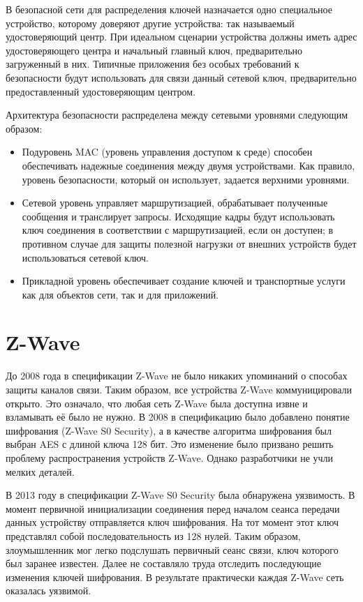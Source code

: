 	В безопасной сети для распределения ключей назначается одно специальное устройство, которому доверяют 
	другие устройства: так называемый удостоверяющий центр. При идеальном сценарии устройства должны 
	иметь адрес удостоверяющего центра и начальный главный ключ, предварительно загруженный в них. 
	Типичные приложения без особых требований к безопасности будут использовать для связи данный сетевой ключ, 
	предварительно предоставленный удостоверяющим центром.
	
	Архитектура безопасности распределена между сетевыми уровнями следующим образом:
	
	\begin{itemize}
		\item Подуровень MAC (уровень управления доступом к среде) способен обеспечивать надежные соединения
		между двумя устройствами. Как правило, уровень безопасности, который он использует, задается 
		верхними уровнями.
		\item Сетевой уровень управляет маршрутизацией, обрабатывает полученные сообщения и транслирует
		запросы. Исходящие кадры будут использовать ключ соединения в соответствии с маршрутизацией, 
		если он доступен; в противном случае для защиты полезной нагрузки от внешних устройств будет 
		использоваться сетевой ключ.
		\item Прикладной уровень обеспечивает создание ключей и транспортные услуги как для объектов
		сети, так и для приложений.
	\end{itemize}

	
	\section{Z-Wave}
	До 2008 года в спецификации Z-Wave не было никаких упоминаний о способах защиты каналов связи. 
	Таким образом, все устройства Z-Wave коммуницировали открыто. Это означало, что любая сеть Z-Wave 
	была доступна извне и взламывать её было не нужно. В 2008 в спецификацию было добавлено понятие 
	шифрования (Z-Wave S0 Security), а в качестве алгоритма шифрования был выбран AES с длиной ключа 128 бит. 
	Это изменение было призвано решить проблему распространения устройств Z-Wave. Однако разработчики
	не учли мелких деталей.
	
	В 2013 году в спецификации  Z-Wave S0 Security была обнаружена уязвимость. В момент первичной 
	инициализации соединения перед началом сеанса передачи данных устройству отправляется ключ шифрования.
	На тот момент этот ключ представлял собой последовательность из 128 нулей. Таким образом, злоумышленник
	мог легко подслушать первичный сеанс связи, ключ которого был заранее известен. Далее не
	составляло труда отследить последующие изменения ключей шифрования. В результате практически
	каждая Z-Wave сеть оказалась уязвимой.
	

